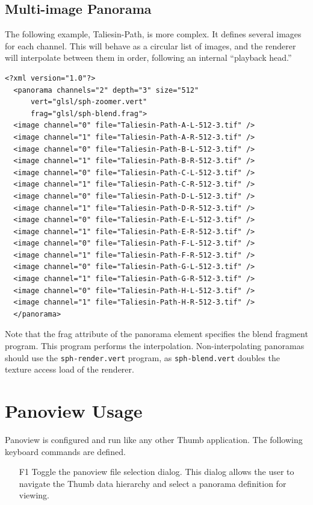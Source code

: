 \documentclass[oneside,10pt]{memoir}
\begin{document}
\begin{Spacing}{1.1}
\subsection{Multi-image Panorama}

The following example, Taliesin-Path, is more complex. It defines several images for each channel. This will behave as a circular list of images, and the renderer will interpolate between them in order, following an internal “playback head.”

\begin{Verbatim}
<?xml version="1.0"?>
  <panorama channels="2" depth="3" size="512"
      vert="glsl/sph-zoomer.vert"
      frag="glsl/sph-blend.frag">
  <image channel="0" file="Taliesin-Path-A-L-512-3.tif" />
  <image channel="1" file="Taliesin-Path-A-R-512-3.tif" />
  <image channel="0" file="Taliesin-Path-B-L-512-3.tif" />
  <image channel="1" file="Taliesin-Path-B-R-512-3.tif" />
  <image channel="0" file="Taliesin-Path-C-L-512-3.tif" />
  <image channel="1" file="Taliesin-Path-C-R-512-3.tif" />
  <image channel="0" file="Taliesin-Path-D-L-512-3.tif" />
  <image channel="1" file="Taliesin-Path-D-R-512-3.tif" />
  <image channel="0" file="Taliesin-Path-E-L-512-3.tif" />
  <image channel="1" file="Taliesin-Path-E-R-512-3.tif" />
  <image channel="0" file="Taliesin-Path-F-L-512-3.tif" />
  <image channel="1" file="Taliesin-Path-F-R-512-3.tif" />
  <image channel="0" file="Taliesin-Path-G-L-512-3.tif" />
  <image channel="1" file="Taliesin-Path-G-R-512-3.tif" />
  <image channel="0" file="Taliesin-Path-H-L-512-3.tif" />
  <image channel="1" file="Taliesin-Path-H-R-512-3.tif" />
  </panorama>
\end{Verbatim}

Note that the frag attribute of the panorama element specifies the blend fragment program. This program performs the interpolation. Non-interpolating panoramas should use the \texttt{sph-render.vert} program, as \texttt{sph-blend.vert} doubles the texture access load of the renderer.

\section{Panoview Usage}

Panoview is configured and run like any other Thumb application. The following keyboard commands are defined.

\begin{itemize}
\item[F1] Toggle the panoview file selection dialog. This dialog allows the user to navigate the Thumb data hierarchy and select a panorama definition for viewing.


\end{itemize}
\end{Spacing}
\end{document}

